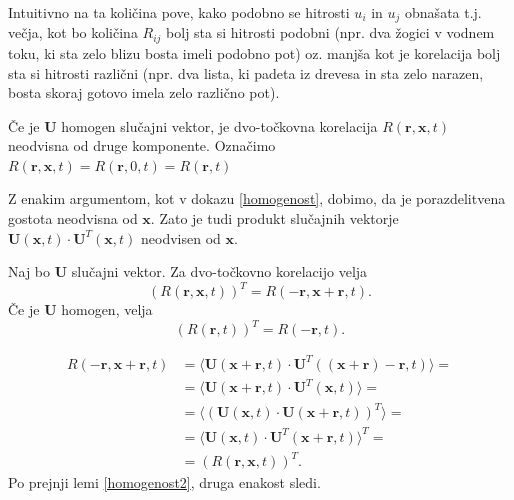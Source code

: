\documentclass[mat2, tisk]{fmfdelo}
\newcommand{\bd}{\textbf}
\begin{document}
Intuitivno na ta količina pove, kako podobno se hitrosti $u_i$ in 
$u_j$ obnašata t.j. večja, kot bo količina $R_{ij}$ bolj sta si hitrosti 
podobni (npr. dva žogici v vodnem toku, ki sta zelo blizu bosta imeli podobno pot) oz. 
manjša kot je korelacija bolj sta si hitrosti različni (npr. dva lista, ki padeta 
iz drevesa in sta zelo narazen, bosta skoraj gotovo imela zelo različno pot).

\begin{lema}
\label{homogenost2}
Če je $\bd{U}$ homogen slučajni vektor, je
dvo-točkovna korelacija $R(\bd{r}, \bd{x}, t)$ neodvisna od druge komponente.
Označimo \\ $R(\bd{r}, \bd{x}, t) = R(\bd{r}, 0, t) = R(\bd{r}, t)$
\end{lema}

\begin{dokaz}
Z enakim argumentom, kot v dokazu \ref{homogenost}, dobimo, da je 
porazdelitvena gostota neodvisna od $\bd{x}$. Zato je tudi produkt 
slučajnih vektorje $\bd{U}(\bd{x}, t)\cdot \bd{U}^T(\bd{x}, t)$ neodvisen 
od $\bd{x}$.
\end{dokaz}

\begin{lema}
\label{dvo_točkovna_korelacija}
Naj bo $\bd{U}$ slučajni vektor. Za dvo-točkovno korelacijo velja 
\begin{equation}
(R(\bd{r}, \bd{x}, t))^T = R(-\bd{r}, \bd{x} + \bd{r}, t). 
\end{equation}
Če je $\bd{U}$ homogen, velja 
\begin{equation}
(R(\bd{r}, t))^T = R(-\bd{r}, t). 
\end{equation}
\end{lema}

\begin{dokaz}
\begin{align*}
  R(-\bd{r}, \bd{x} + \bd{r}, t) &= \langle \bd{U}(\bd{x} + \bd{r}, t)\cdot \bd{U}^T((\bd{x} + \bd{r}) - \bd{r}, t)\rangle = \\
  &= \langle \bd{U}(\bd{x} + \bd{r}, t)\cdot \bd{U}^T(\bd{x}, t)\rangle = \\
  &= \langle(\bd{U}(\bd{x}, t)\cdot \bd{U}(\bd{x} + \bd{r}, t))^T\rangle =\\
  &= \langle \bd{U}(\bd{x}, t)\cdot \bd{U}^T(\bd{x} + \bd{r}, t)\rangle^T =\\
  &= (R(\bd{r}, \bd{x}, t))^T.
\end{align*}  
Po prejnji lemi \ref{homogenost2}, druga enakost sledi.
\end{dokaz}
\end{document}
